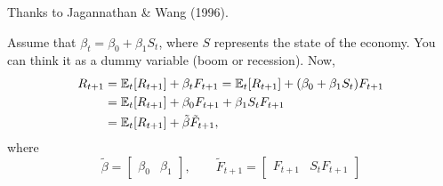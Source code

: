 Thanks to Jagannathan \& Wang (1996).

Assume that $\beta_t = \beta_0 + \beta_1 S_t$, where $S$ represents the state of the economy. You can think it as a dummy variable (boom or recession). Now,
$$
\begin{aligned}
		R_{t+1} &= \mathbb{E}_{t}[R_{t+1}] + \beta_t F_{t+1} = \mathbb{E}_{t}[R_{t+1}]  + (\beta_0 + \beta_1 S_t)F_{t+1}\\
				&= \mathbb{E}_t[R_{t+1}] + \beta_0 F_{t+1} + \beta_1 S_t F_{t+1}\\
				&= \mathbb{E}_{t}[R_{t+1}] + \tilde{\beta}\tilde{F}_{t+1},
\end{aligned}
$$
where 
$$
\tilde{\beta} = 	\begin{bmatrix}
\beta_0 & \beta_1
	\end{bmatrix},
\quad\quad
	\tilde{F}_{t+1} = 
	\begin{bmatrix}
		F_{t+1} & S_{t}F_{t+1}
	\end{bmatrix}
$$
